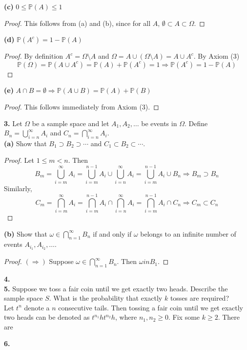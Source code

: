 \documentclass{paper}
\newcommand{\pr}{\mathbb{P}}
\begin{document}
\textbf{(c)} $0\le \pr(A) \le 1$
\begin{proof}
This follows from (a) and (b), since for all $A$, $\emptyset\subset A \subset \Omega$.
\end{proof}

\textbf{(d)} $\pr(A^c) = 1 - \pr(A)$
\begin{proof}
By definition $A^c = \Omega\setminus A$ and $\Omega = A \cup (\Omega\setminus A) = A\cup A^c$. By Axiom (3)
\[
\pr(\Omega) = \pr( A \cup A^c) = \pr(A) + \pr(A^c) = 1 \Rightarrow \pr(A^c) = 1 - \pr(A)
\]
\end{proof}

\textbf{(e)} $A\cap B = \emptyset \Rightarrow \pr(A\cup B) = \pr(A) + \pr(B)$
\begin{proof}
This follows immediately from Axiom (3).
\end{proof}


\textbf{3.} Let $\Omega$ be a sample space and let $A_1, A_2, \ldots$ be events in $\Omega$. Define $B_n = \bigcup_{i=n}^{\infty}A_i$ and $C_n = \bigcap_{i=n}^{\infty} A_i$.\\

\textbf{(a)} Show that $B_1\supset B_2\supset \cdots$ and $C_1\subset B_2\subset \cdots$.

\begin{proof}
Let $1 \le m<n$. Then
\[
B_m =  \bigcup_{i=m}^{\infty}A_i 
=  \bigcup_{i=m}^{n-1}A_i \cup  \bigcup_{i=n}^{\infty}A_i 
= \bigcup_{i=m}^{n-1}A_i \cup  B_n 
\Rightarrow B_m\supset B_n
\]
Similarly,
\[
C_m =  \bigcap_{i=m}^{\infty}A_i 
=  \bigcap_{i=m}^{n-1}A_i \cap  \bigcap_{i=n}^{\infty}A_i 
= \bigcap_{i=m}^{n-1}A_i \cap  C_n 
\Rightarrow C_m \subset C_n
\]
\end{proof}

\textbf{(b)} Show that $\omega \in \bigcap_{n=1}^{\infty} B_n$ if and only if $\omega$ belongs to an infinite number of events $A_{i_1}, A_{i_2}, \ldots$. 

\begin{proof}
$(\Rightarrow)$ Suppose $\omega\in \bigcap_{n=1}^{\infty} B_n$. Then $\omega in B_1$. 
\end{proof}

\textbf{4.}\\

\textbf{5.} Suppose we toss a fair coin until we get exactly two heads. Describe the sample space $S$. What is the probability that exactly $k$ tosses are required?\\

Let $t^n$ denote a $n$ consecutive tails. Then tossing a fair coin until we get exactly two heads can be denoted as $t^{n_1}ht^{n_2}h$, where $n_1, n_2 \ge 0$. Fix some $k\ge 2$. There are 



\textbf{6.}
\end{document}
